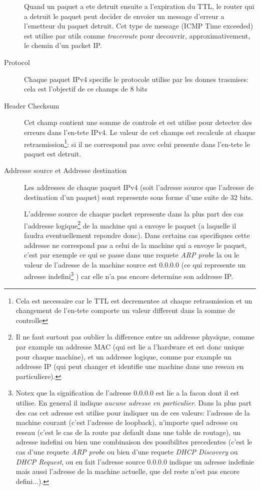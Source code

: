 \begin{description}
Quand un paquet a ete detruit ensuite a l'expiration du TTL, le router qui a
detruit le paquet peut decider de envoier un message d'erreur a l'emetteur du
paquet detruit. Cet type de message (ICMP Time exceeded) est utilise par
utils comme {\it traceroute} pour decouvrir, approximativement, le chemin 
d'un packet IP.

\item [Protocol]
Chaque paquet IPv4 specifie le protocole utilise par les donnes trasmises:
cela est l'objectif de ce champs de 8 bits 

\item [Header Checksum]
Cet champ contient une somme de controle et est utilise pour detecter des 
erreurs dans l'en-tete IPv4. Le valeur de cet champs est recalcule at
chaque retrasmission\footnote {Cela est necessaire car le TTL est decrementee
at chaque retrasmission et un changement de l'en-tete comporte un valeur different
dans la somme de controlle}: si il ne correspond pas avec celui 
presente dans l'en-tete le paquet est detruit.


\item [Addresse source et Addresse destination]
Les addresses de chaque paquet IPv4 (soit l'adresse source que l'adresse de
destination d'un paquet) sont represente sous forme d'une suite de 32 bits.

L'addresse source de chaque packet represente dans la plus part des cas
l'addresse logique\footnote {Il ne faut surtout pas oublier la difference entre
un addresse physique, comme par example un addresse MAC (qui est lie a
l'hardware et est donc unique pour chaque machine), et un addresse logique,
comme par example un addresse IP (qui peut changer et identifie une machine
dans une reseau en particuliere).} de la machine qui a envoye le paquet
(a laquelle il faudra eventuellement repondre donc).  Dans certains cas
specifiques cette addresse ne correspond pas a celui de la machine qui a envoye
le paquet, c'est par exemple ce qui se passe dans une requete {\it ARP probe}
la ou le valeur de l'adresse de la machine source est 0.0.0.0 (ce qui represente
un adresse indefini\footnote {Notex que la signification de l'adresse 0.0.0.0
est lie a la facon dont il est utilise. En general il indique {\it aucune
adresse en particulier}.  Dans la plus part des cas cet adresse est utilise
pour indiquer un de ces valeurs: l'adresse de la machine courant (c'est
l'adresse de loopback), n'importe quel adresse ou reseau (c'est le cas de la
route par default dans une table de routage), un adresse indefini ou bien une
combinaison des possibilites precedentes (c'est le cas d'une requete {\it ARP
probe} ou bien d'une requete {\it DHCP Discovery} ou {\it DHCP Request}, ou en
fait l'adresse source 0.0.0.0 indique un adresse indefinie mais aussi l'adresse
de la machine actuelle, que del reste n'est pas encore defini...).}
) car elle n'a pas encore determine son addresse IP. 


\end{description}
